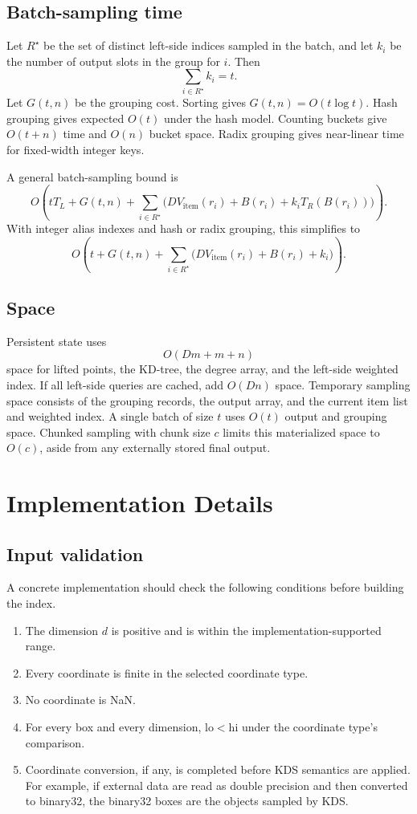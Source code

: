 \documentclass[11pt]{article}
\theoremstyle{definition}
\theoremstyle{plain}
\theoremstyle{remark}
\newcommand{\lo}{\mathrm{lo}}
\newcommand{\hi}{\mathrm{hi}}
\begin{document}
\subsection{Batch-sampling time}

Let $R^\star$ be the set of distinct left-side indices sampled in the batch, and let $k_i$
be the number of output slots in the group for $i$.  Then
\[
  \sum_{i\in R^\star}k_i=t.
\]
Let $G(t,n)$ be the grouping cost.  Sorting gives $G(t,n)=O(t\log t)$.  Hash grouping gives
expected $O(t)$ under the hash model.  Counting buckets give $O(t+n)$ time and $O(n)$ bucket
space.  Radix grouping gives near-linear time for fixed-width integer keys.

A general batch-sampling bound is
\[
  O\left(
      tT_L + G(t,n)
      + \sum_{i\in R^\star}
          \bigl(DV_{\mathrm{item}}(r_i)+B(r_i)+k_iT_R(B(r_i))\bigr)
    \right).
\]
With integer alias indexes and hash or radix grouping, this simplifies to
\[
  O\left(
      t
      + G(t,n)
      + \sum_{i\in R^\star}\bigl(DV_{\mathrm{item}}(r_i)+B(r_i)+k_i\bigr)
    \right).
\]

\subsection{Space}

Persistent state uses
\[
  O(Dm+m+n)
\]
space for lifted points, the KD-tree, the degree array, and the left-side weighted index.
If all left-side queries are cached, add $O(Dn)$ space.  Temporary sampling space consists
of the grouping records, the output array, and the current item list and weighted index.  A
single batch of size $t$ uses $O(t)$ output and grouping space.  Chunked sampling with chunk
size $c$ limits this materialized space to $O(c)$, aside from any externally stored final
output.

\section{Implementation Details}

\subsection{Input validation}

A concrete implementation should check the following conditions before building the index.
\begin{enumerate}[leftmargin=2em]
  \item The dimension $d$ is positive and is within the implementation-supported range.
  \item Every coordinate is finite in the selected coordinate type.
  \item No coordinate is NaN.
  \item For every box and every dimension, $\lo<\hi$ under the coordinate type's comparison.
  \item Coordinate conversion, if any, is completed before KDS semantics are applied.  For
        example, if external data are read as double precision and then converted to
        binary32, the binary32 boxes are the objects sampled by KDS.
\end{enumerate}
\end{document}
